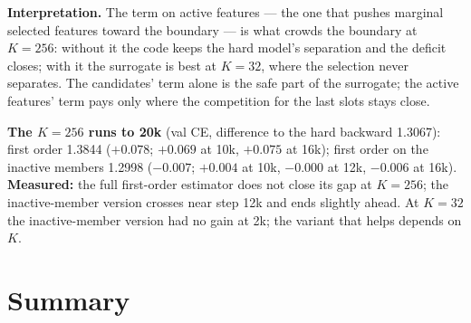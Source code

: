 \documentclass[11pt,a4paper]{article}
\begin{document}
\textbf{Interpretation.}  The term on active features --- the one that pushes marginal selected features toward the
boundary --- is what crowds the boundary at \(K=256\): without it the code keeps the hard model's separation and the
deficit closes; with it the surrogate is best at \(K=32\), where the selection never separates.  The candidates'
term alone is the safe part of the surrogate; the active features' term pays only where the competition for the
last slots stays close.

\textbf{The \(K=256\) runs to 20k} (val CE, difference to the hard backward 1.3067): first order 1.3844 (\(+0.078\);
\(+0.069\) at 10k, \(+0.075\) at 16k); first order on the inactive members 1.2998 (\(-0.007\); \(+0.004\) at 10k, \(-0.000\)
at 12k, \(-0.006\) at 16k).  \textbf{Measured:} the full first-order estimator does not close its gap at \(K=256\); the
inactive-member version crosses near step 12k and ends slightly ahead.  At \(K=32\) the inactive-member version had
no gain at 2k; the variant that helps depends on \(K\).

\section{Summary}
\end{document}
